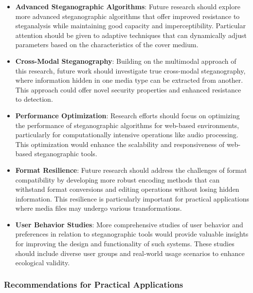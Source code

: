 \documentclass[12pt, a4paper, oneside]{book}
\begin{document}
\begin{itemize}[leftmargin=*]
    \item \textbf{Advanced Steganographic Algorithms}: Future research should explore more advanced steganographic algorithms that offer improved resistance to steganalysis while maintaining good capacity and imperceptibility. Particular attention should be given to adaptive techniques that can dynamically adjust parameters based on the characteristics of the cover medium.

    \item \textbf{Cross-Modal Steganography}: Building on the multimodal approach of this research, future work should investigate true cross-modal steganography, where information hidden in one media type can be extracted from another. This approach could offer novel security properties and enhanced resistance to detection.

    \item \textbf{Performance Optimization}: Research efforts should focus on optimizing the performance of steganographic algorithms for web-based environments, particularly for computationally intensive operations like audio processing. This optimization would enhance the scalability and responsiveness of web-based steganographic tools.

    \item \textbf{Format Resilience}: Future research should address the challenges of format compatibility by developing more robust encoding methods that can withstand format conversions and editing operations without losing hidden information. This resilience is particularly important for practical applications where media files may undergo various transformations.

    \item \textbf{User Behavior Studies}: More comprehensive studies of user behavior and preferences in relation to steganographic tools would provide valuable insights for improving the design and functionality of such systems. These studies should include diverse user groups and real-world usage scenarios to enhance ecological validity.
\end{itemize}

\subsubsection{Recommendations for Practical Applications}
\end{document}

